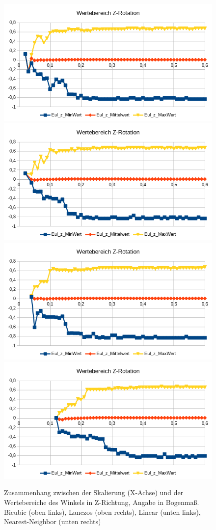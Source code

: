 \begin{figure}
	\centering
	\includegraphics[width=0.45\linewidth]{tabelle2/Z_Rot_Val_Cubic}
	\includegraphics[width=0.45\linewidth]{tabelle2/Z_Rot_Val_Lanc}
	\includegraphics[width=0.45\linewidth]{tabelle2/Z_Rot_Val_Linear}
	\includegraphics[width=0.45\linewidth]{tabelle2/Z_Rot_Val_NN}
	\caption{Zusammenhang zwischen der Skalierung (X-Achse) und der Wertebereiche des Winkels in Z-Richtung, Angabe in Bogenmaß.
		Bicubic (oben links), Lanczos (oben rechts), Linear (unten links), Nearest-Neighbor (unten rechts)}
	\label{img_Z_Rot_Val_Skal}
\end{figure}
